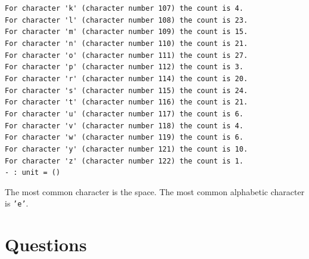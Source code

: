 \documentclass[]{book}
\newcommand{\smspace}{\vspace{4mm}}
\begin{document}
\verb!For character 'k' (character number 107) the count is 4.!\\
\verb!For character 'l' (character number 108) the count is 23.!\\
\verb!For character 'm' (character number 109) the count is 15.!\\
\verb!For character 'n' (character number 110) the count is 21.!\\
\verb!For character 'o' (character number 111) the count is 27.!\\
\verb!For character 'p' (character number 112) the count is 3.!\\
\verb!For character 'r' (character number 114) the count is 20.!\\
\verb!For character 's' (character number 115) the count is 24.!\\
\verb!For character 't' (character number 116) the count is 21.!\\
\verb!For character 'u' (character number 117) the count is 6.!\\
\verb!For character 'v' (character number 118) the count is 4.!\\
\verb!For character 'w' (character number 119) the count is 6.!\\
\verb!For character 'y' (character number 121) the count is 10.!\\
\verb!For character 'z' (character number 122) the count is 1.!\\
\noindent\verb!- : unit = ()!\vphantom{g}
\smspace

\noindent The most common character is the space. The most common alphabetic character is \texttt{'e'}.

\clearpage
\section*{Questions}
\end{document}
